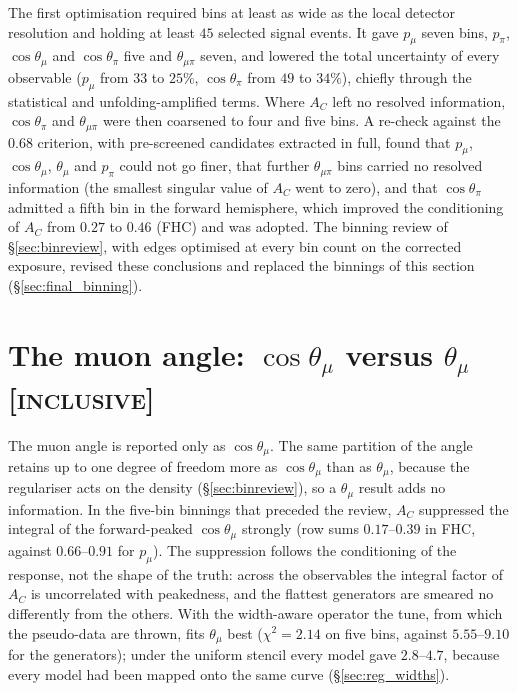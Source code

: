 \documentclass[11pt,a4paper]{article}
\newcommand{\scopetag}[1]{\hfill{\normalfont\small\textsc{[#1]}}}
\begin{document}
The first optimisation required bins at least as wide as the local detector resolution and holding at
least $45$ selected signal events. It gave $p_\mu$ seven bins, $p_\pi$, $\cos\theta_\mu$ and
$\cos\theta_\pi$ five and $\theta_{\mu\pi}$ seven, and lowered the total uncertainty of every observable
($p_\mu$ from $33$ to $25\%$, $\cos\theta_\pi$ from $49$ to $34\%$), chiefly through the statistical and
unfolding-amplified terms. Where $A_C$ left no resolved information, $\cos\theta_\pi$ and $\theta_{\mu\pi}$
were then coarsened to four and five bins. A re-check against the $0.68$ criterion, with pre-screened
candidates extracted in full, found that $p_\mu$, $\cos\theta_\mu$, $\theta_\mu$ and $p_\pi$ could not go
finer, that further $\theta_{\mu\pi}$ bins carried no resolved information (the smallest singular value of
$A_C$ went to zero), and that $\cos\theta_\pi$ admitted a fifth bin in the forward hemisphere, which
improved the conditioning of $A_C$ from $0.27$ to $0.46$ (FHC) and was adopted. The binning review of
\S\ref{sec:binreview}, with edges optimised at every bin count on the corrected exposure, revised these
conclusions and replaced the binnings of this section (\S\ref{sec:final_binning}).

\section[The muon angle: cos theta versus theta]{The muon angle: \texorpdfstring{$\cos\theta_\mu$}{cos(theta mu)} versus \texorpdfstring{$\theta_\mu$}{theta mu}\scopetag{inclusive}}
\label{sec:thetavar}

The muon angle is reported only as $\cos\theta_\mu$. The same partition of the angle retains up to one
degree of freedom more as $\cos\theta_\mu$ than as $\theta_\mu$, because the regulariser acts on the density
(\S\ref{sec:binreview}), so a $\theta_\mu$ result adds no information. In the five-bin binnings that preceded
the review, $A_C$ suppressed the integral of the forward-peaked $\cos\theta_\mu$ strongly (row sums
$0.17$--$0.39$ in FHC, against $0.66$--$0.91$ for $p_\mu$). The suppression follows the conditioning of the
response, not the shape of the truth: across the observables the integral factor of $A_C$ is uncorrelated
with peakedness, and the flattest generators are smeared no differently from the others. With the
width-aware operator the tune, from which the pseudo-data are thrown, fits $\theta_\mu$ best ($\chi^2=2.14$
on five bins, against $5.55$--$9.10$ for the generators); under the uniform stencil every model gave
$2.8$--$4.7$, because every model had been mapped onto the same curve (\S\ref{sec:reg_widths}).
\end{document}
